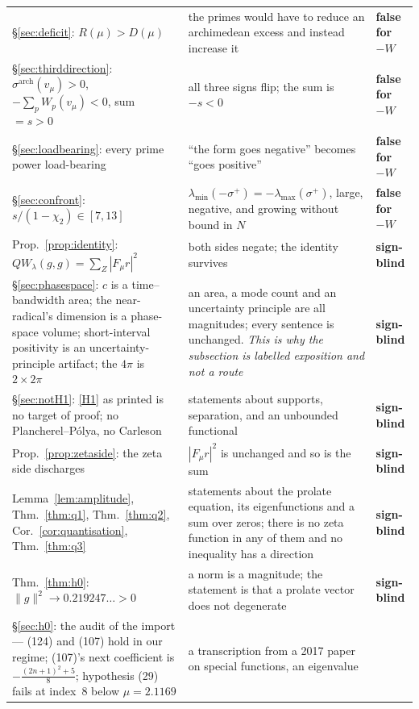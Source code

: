 \documentclass[11pt,a4paper]{article}
\theoremstyle{plain}
\theoremstyle{definition}
\theoremstyle{remark}
\newcommand{\R}{\mathbb{R}}
\newcommand{\Z}{\mathbb{Z}}
\newcommand{\Q}{\mathbb{Q}}
\newcommand{\A}{\mathbb{A}}
\newcommand{\E}{\mathcal{E}}
\newcommand{\F}{\mathcal{F}}
\newcommand{\QW}{QW}
\def\QW{QW}\def\E{E}\def\F{F}\def\R{R}\def\Q{Q}\def\Z{Z}\def\A{A}%
\begin{document}
\begin{center}
\begin{tabular}{@{}p{}p{}p{}@{}}
\S\ref{sec:deficit}: $R(\mu)>D(\mu)$
& the primes would have to reduce an archimedean excess and instead increase it
& \textbf{false for $-W$} \\
\S\ref{sec:thirddirection}: $\sigma^{\mathrm{arch}}(v_\mu)>0$,
$-\sum_pW_p(v_\mu)<0$, sum $=s>0$
& all three signs flip; the sum is $-s<0$
& \textbf{false for $-W$} \\
\S\ref{sec:loadbearing}: every prime power load-bearing
& ``the form goes negative'' becomes ``goes positive''
& \textbf{false for $-W$} \\
\S\ref{sec:confront}: $s/(1-\chi_2)\in[7,13]$
& $\lambda_{\min}(-\sigma^+)=-\lambda_{\max}(\sigma^+)$, large, negative, and
growing without bound in $N$
& \textbf{false for $-W$} \\
Prop.~\ref{prop:identity}: $\QW_\lambda(g,g)=\sum_Z|\F_\mu r|^2$
& both sides negate; the identity survives
& \textbf{sign-blind} \\
\S\ref{sec:phasespace}: $c$ is a time--bandwidth area; the near-radical's
dimension is a phase-space volume; short-interval positivity is an
uncertainty-principle artifact; the $4\pi$ is $2\times2\pi$
& an area, a mode count and an uncertainty principle are all magnitudes; every
sentence is unchanged.  \emph{This is why the subsection is labelled exposition
and not a route}
& \textbf{sign-blind} \\
\S\ref{sec:notH1}: \eqref{H1} as printed is no target of proof; no
Plancherel--P\'olya, no Carleson
& statements about supports, separation, and an unbounded functional
& \textbf{sign-blind} \\
Prop.~\ref{prop:zetaside}: the zeta side discharges
& $|\F_\mu r|^2$ is unchanged and so is the sum
& \textbf{sign-blind} \\
Lemma~\ref{lem:amplitude}, Thm.~\ref{thm:q1}, Thm.~\ref{thm:q2},
Cor.~\ref{cor:quantisation}, Thm.~\ref{thm:q3}
& statements about the prolate equation, its eigenfunctions and a sum over
zeros; there is no zeta function in any of them and no inequality has a
direction
& \textbf{sign-blind} \\
Thm.~\ref{thm:h0}: $\|g\|^2\to0.219247\ldots>0$
& a norm is a magnitude; the statement is that a prolate vector does not
degenerate
& \textbf{sign-blind} \\
\S\ref{sec:h0}: the audit of the import --- (124) and (107) hold in our regime;
(107)'s next coefficient is $-\frac{(2n+1)^2+5}{8}$; hypothesis (29) fails at
index~$8$ below $\mu=2.1169$
& a transcription from a 2017 paper on special functions, an eigenvalue

\end{tabular}
\end{center}
\end{document}
